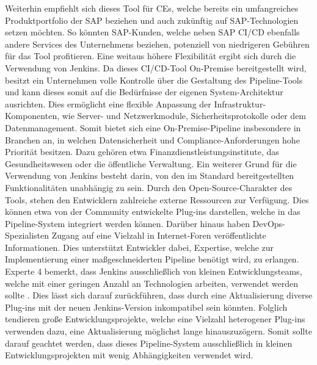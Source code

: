 \vspace*{-15mm}
Weiterhin empfiehlt sich dieses Tool für CEs, welche bereits ein umfangreiches Produktportfolio der SAP beziehen und auch zukünftig auf SAP-Technologien setzen möchten. So könnten SAP-Kunden, welche neben SAP CI/CD ebenfalls andere Services des Unternehmens beziehen, potenziell von niedrigeren Gebühren für das Tool profitieren. Eine weitaus höhere Flexibilität ergibt sich durch die Verwendung von Jenkins. Da dieses CI/CD-Tool On-Premise bereitgestellt wird, besitzt ein Unternehmen volle Kontrolle über die Gestaltung des Pipeline-Tools und kann dieses somit auf die Bedürfnisse der eigenen System-Architektur ausrichten. Dies ermöglicht eine flexible Anpassung der Infrastruktur-Komponenten, wie Server- und Netzwerkmodule, Sicherheitsprotokolle oder dem Datenmanagement. Somit bietet sich eine On-Premise-Pipeline insbesondere in Branchen an, in welchen Datensicherheit und Compliance-Anforderungen hohe Priorität besitzen. Dazu gehören etwa Finanzdienstleistungsinstitute, das Gesundheitswesen oder die öffentliche Verwaltung. Ein weiterer Grund für die Verwendung von Jenkins besteht darin, von den im Standard bereitgestellten Funktionalitäten unabhängig zu sein. Durch den Open-Source-Charakter des Tools, stehen den Entwicklern zahlreiche externe Ressourcen zur Verfügung. Dies können etwa von der Community entwickelte Plug-ins darstellen, welche in das Pipeline-System integriert werden können. Darüber hinaus haben DevOps-Spezialisten Zugang auf eine Vielzahl in Internet-Foren veröffentlichte Informationen. Dies unterstützt Entwickler dabei, Expertise, welche zur Implementierung einer maßgeschneiderten Pipeline benötigt wird, zu erlangen. Experte 4 bemerkt, dass Jenkins ausschließlich von kleinen Entwicklungsteams, welche mit einer geringen Anzahl an Technologien arbeiten, verwendet werden sollte \cite[Z. 58 ff.]{TestDeveloperSAPHyperspaceAdoption&Onboarding.}. Dies lässt sich darauf zurückführen, dass durch eine Aktualisierung diverse Plug-ins mit der neuen Jenkins-Version inkompatibel sein könnten. Folglich tendieren große Entwicklungsprojekte, welche eine Vielzahl heterogener Plug-ins verwenden dazu, eine Aktualisierung möglichst lange hinauszuzögern. Somit sollte darauf geachtet werden, dass dieses Pipeline-System ausschließlich in kleinen Entwicklungsprojekten mit wenig Abhängigkeiten verwendet wird.  
